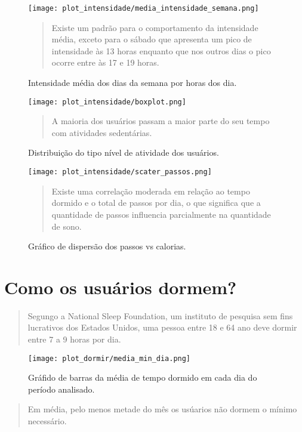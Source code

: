 \documentclass[a4paper, oneside]{report}
\begin{document}
\begin{figure}[h]
\centering %
\texttt{[image: plot\_intensidade/media\_intensidade\_semana.png]} 
\caption{Intensidade média dos dias da semana por horas dos dia.}
\label{figura: Figura 8}
\begin{quotation}
Existe um padrão para o comportamento da intensidade média, exceto para o sábado que apresenta um pico de intensidade às 13 horas enquanto que nos outros dias o pico ocorre entre às 17 e 19 horas.
\end{quotation}
\end{figure}
        
\begin{figure}[h]
\centering %
\texttt{[image: plot\_intensidade/boxplot.png]} 
\caption{Distribuição do tipo nível de atividade dos usuários.}
\label{figura: Figura 9}
\begin{quotation}
A maioria dos usuários passam a maior parte do seu tempo com atividades sedentárias.
\end{quotation}
\end{figure}

\begin{figure}[h]
\centering %
\texttt{[image: plot\_intensidade/scater\_passos.png]} 
\caption{Gráfico de dispersão dos passos vs calorias.}
\label{figura: Figura 10}
\begin{quotation}
Existe uma correlação moderada em relação ao tempo dormido e o total de passos por dia, o que significa que a quantidade de passos influencia parcialmente na quantidade de sono.
\end{quotation}
\end{figure}

 
\chapter*{Como os usuários dormem?}

\begin{quotation}
Segungo a National Sleep Foundation, um instituto de pesquisa sem fins lucrativos dos Estados Unidos, uma pessoa entre 18 e 64 ano deve dormir entre 7 a 9 horas por dia.
\end{quotation}


\begin{figure}[h]
\centering %
\texttt{[image: plot\_dormir/media\_min\_dia.png]}
\caption{Gráfido de barras da média de tempo dormido em cada dia do período analisado.}
\label{figura:Figura 1}
\end{figure}
\begin{quotation}
Em média, pelo menos metade do mês os usúarios não dormem o mínimo necessário.
\end{quotation}
\end{document}
